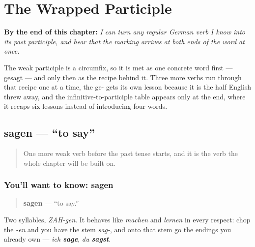 
\chapter{The Wrapped Participle}
\label{ch:ge-partizip}

\begin{chapteropening}
\textbf{By the end of this chapter:} \emph{I can turn any regular German verb I know into its past participle, and hear that the marking arrives at both ends of the word at once.}

The weak participle is a circumfix, so it is met as one concrete word first — gesagt — and only then as the recipe behind it. Three more verbs run through that recipe one at a time, the ge- gets its own lesson because it is the half English threw away, and the infinitive-to-participle table appears only at the end, where it recaps six lessons instead of introducing four words.
\end{chapteropening}

\section[sagen]{sagen — \textquotedblleft{}to say\textquotedblright{}}

\label{lesson:GE-C15-sagen}



\begin{quote}
One more weak verb before the past tense starts, and it is the verb the whole chapter will be built on.
\end{quote}

\subsection*{You'll want to know: sagen}
\begin{quote}
\textbf{sagen} — \textquotedblleft{}to say.\textquotedblright{}
\end{quote}

Two syllables, \emph{ZAH-gen}. It behaves like \emph{machen} and \emph{lernen} in every respect: chop the \emph{-en} and you have the stem \emph{sag-}, and onto that stem go the endings you already own — \emph{ich \textbf{sage}}, \emph{du \textbf{sagst}}.

